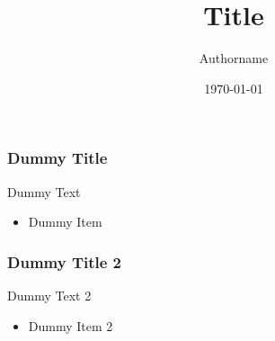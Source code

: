 \documentclass{beamer}
\title{Title}
\author{ Authorname
}
\date{\today}
\begin{document}
\maketitle


\begin{frame}

  \frametitle{Dummy Title}
  Dummy Text
  \begin{itemize}

	\item Dummy Item

  \end{itemize}
\end{frame}

\begin{frame}

  \frametitle{Dummy Title 2}
   Dummy Text 2
  \begin{itemize}

	\item Dummy Item 2

  \end{itemize}
\end{frame}
\end{document}

